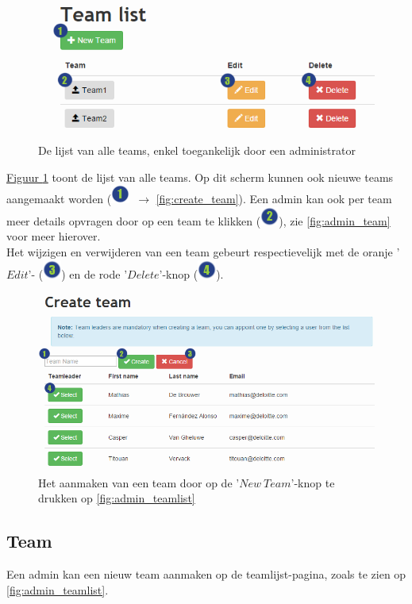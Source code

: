 \documentclass[a4paper,11pt]{article}
\newcommand{\one}{\includegraphics[scale=0.5]{Gebruikershandleiding_img/1.png}}
\newcommand{\two}{\includegraphics[scale=0.5]{Gebruikershandleiding_img/2.png}}
\newcommand{\three}{\includegraphics[scale=0.5]{Gebruikershandleiding_img/3.png}}
\newcommand{\four}{\includegraphics[scale=0.5]{Gebruikershandleiding_img/4.png}}
\begin{document}
\begin{figure}[H]
\centering
\includegraphics[scale=0.5]{Gebruikershandleiding_img/admin_teamlist.png}
\caption{De lijst van alle teams, enkel toegankelijk door een administrator}
\label{fig:admin_teamlist}
\end{figure}

\hyperref[fig:admin_teamlist]{Figuur \ref{fig:admin_teamlist}} toont de lijst van alle teams.  Op dit scherm kunnen ook nieuwe teams aangemaakt worden (\one\ $\rightarrow$ \autoref{fig:create_team}). Een admin kan ook per team meer details opvragen door op een team te klikken (\two), zie \autoref{fig:admin_team} voor meer hierover.\\
Het wijzigen en verwijderen van een team gebeurt respectievelijk met de oranje '$Edit$'- (\three) en de rode '$Delete$'-knop (\four).

\begin{figure}[H]
\centering
\includegraphics[scale=0.5]{Gebruikershandleiding_img/create_team.png}
\caption{Het aanmaken van een team door op de '$New\ Team$'-knop te drukken op \autoref{fig:admin_teamlist}}
\label{fig:create_team}
\end{figure}

\subsection{Team}
\label{sec:admin_team}
Een admin kan een nieuw team aanmaken op de teamlijst-pagina, zoals te zien op \autoref{fig:admin_teamlist}.
\end{document}

